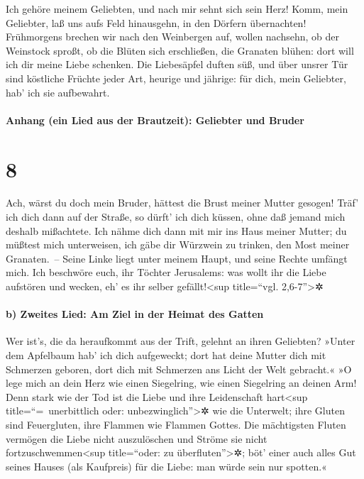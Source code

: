 Ich gehöre meinem Geliebten, und nach mir sehnt sich sein
Herz! Komm, mein Geliebter, laß uns aufs Feld hinausgehn,
in den Dörfern übernachten! Frühmorgens brechen wir nach
den Weinbergen auf, wollen nachsehn, ob der Weinstock sproßt, ob die
Blüten sich erschließen, die Granaten blühen: dort will ich dir meine
Liebe schenken. Die Liebesäpfel duften süß, und über
unsrer Tür sind köstliche Früchte jeder Art, heurige und jährige: für
dich, mein Geliebter, hab' ich sie aufbewahrt.

\hypertarget{anhang-ein-lied-aus-der-brautzeit-geliebter-und-bruder}{%
\paragraph{Anhang (ein Lied aus der Brautzeit): Geliebter und
Bruder}\label{anhang-ein-lied-aus-der-brautzeit-geliebter-und-bruder}}

\hypertarget{section-7}{%
\section{8}\label{section-7}}

Ach, wärst du doch mein Bruder, hättest die Brust meiner
Mutter gesogen! Träf' ich dich dann auf der Straße, so dürft' ich dich
küssen, ohne daß jemand mich deshalb mißachtete. Ich nähme
dich dann mit mir ins Haus meiner Mutter; du müßtest mich unterweisen,
ich gäbe dir Würzwein zu trinken, den Most meiner Granaten.~--
Seine Linke liegt unter meinem Haupt, und seine Rechte
umfängt mich. Ich beschwöre euch, ihr Töchter Jerusalems:
was wollt ihr die Liebe aufstören und wecken, eh' es ihr selber
gefällt!\textless sup title=``vgl. 2,6-7''\textgreater✲

\hypertarget{b-zweites-lied-am-ziel-in-der-heimat-des-gatten}{%
\paragraph{b) Zweites Lied: Am Ziel in der Heimat des
Gatten}\label{b-zweites-lied-am-ziel-in-der-heimat-des-gatten}}

Wer ist's, die da heraufkommt aus der Trift, gelehnt an
ihren Geliebten? »Unter dem Apfelbaum hab' ich dich aufgeweckt; dort hat
deine Mutter dich mit Schmerzen geboren, dort dich mit Schmerzen ans
Licht der Welt gebracht.« »O lege mich an dein Herz wie
einen Siegelring, wie einen Siegelring an deinen Arm! Denn stark wie der
Tod ist die Liebe und ihre Leidenschaft hart\textless sup
title=``=~unerbittlich oder: unbezwinglich''\textgreater✲ wie die
Unterwelt; ihre Gluten sind Feuergluten, ihre Flammen wie Flammen
Gottes. Die mächtigsten Fluten vermögen die Liebe nicht
auszulöschen und Ströme sie nicht fortzuschwemmen\textless sup
title=``oder: zu überfluten''\textgreater✲; böt' einer auch alles Gut
seines Hauses (als Kaufpreis) für die Liebe: man würde sein nur
spotten.«

